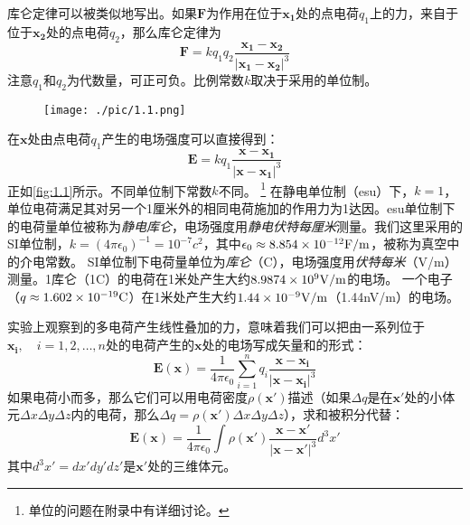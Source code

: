 \documentclass[12pt]{book}
\numberwithin{equation}{chapter}
\numberwithin{figure}{chapter}
\numberwithin{footnote}{page}
\begin{document}
库仑定律可以被类似地写出。如果$\mathbf{F}$为作用在位于$\mathbf{x_1}$处的点电荷$q_1$上的力，来自于位于$\mathbf{x_2}$处的点电荷$q_2$，那么库仑定律为
\begin{equation}\label{eq:1.2}
    \mathbf{F}=kq_1q_2\frac{\mathbf{x_1}-\mathbf{x_2}}{|\mathbf{x_1}-\mathbf{x_2}|^3}
\end{equation}
注意$q_1$和$q_2$为代数量，可正可负。比例常数$k$取决于采用的单位制。

\begin{figure}[!ht]
    \centering
    \texttt{[image: ./pic/1.1.png]}
    \captionsetup{justification=raggedright, singlelinecheck=false}
    \caption{}
    \label{fig:1.1}
\end{figure}

在$\mathbf{x}$处由点电荷$q_1$产生的电场强度可以直接得到：
\begin{equation}\label{eq:1.3}
    \mathbf{E}=kq_1\frac{\mathbf{x}-\mathbf{x_1}}{|\mathbf{x}-\mathbf{x_1}|^3}
\end{equation}
正如\autoref{fig:1.1}所示。不同单位制下常数$k$不同。
\footnote{单位的问题在附录中有详细讨论。}
在静电单位制（esu）下，$k=1$，单位电荷满足其对另一个1厘米外的相同电荷施加的作用力为1达因。esu单位制下的电荷量单位被称为\textit{静电库仑}，电场强度用\textit{静电伏特每厘米}测量。我们这里采用的SI单位制，$k=(4\pi\epsilon_0)^{-1}=10^{-7}c^2$，其中$\epsilon_0\approx8.854\times 10^{-12}{\rm F/m}$，被称为真空中的介电常数。
SI单位制下电荷量单位为\textit{库仑}（C），电场强度用\textit{伏特每米}（V/m）测量。1库仑（1C）的电荷在1米处产生大约$8.9874\times 10^9{\rm V/m}$的电场。
一个电子（$q\approx1.602\times 10^{-19}{\rm C}$）在1米处产生大约$1.44\times 10^{-9}{\rm V/m}$（1.44nV/m）的电场。

实验上观察到的多电荷产生线性叠加的力，意味着我们可以把由一系列位于$\mathbf{x_i},\quad i=1,2,\dots,n$处的电荷产生的$\mathbf{x}$处的电场写成矢量和的形式：
\begin{equation}\label{eq:1.4}
    \mathbf{E}(\mathbf{x})=\frac{1}{4\pi\epsilon_0}\sum_{i=1}^n q_i\frac{\mathbf{x}-\mathbf{x_i}}{|\mathbf{x}-\mathbf{x_i}|^3}
\end{equation}
如果电荷小而多，那么它们可以用电荷密度$\rho(\mathbf{x'})$描述（如果$\Delta q$是在$\mathbf{x'}$处的小体元$\Delta x\Delta y\Delta z$内的电荷，那么$\Delta q=\rho(\mathbf{x'})\Delta x\Delta y\Delta z$），求和被积分代替：
\begin{equation}\label{eq:1.5}
    \mathbf{E}(\mathbf{x})=\frac{1}{4\pi\epsilon_0}\int \rho(\mathbf{x'})\frac{\mathbf{x}-\mathbf{x'}}{|\mathbf{x}-\mathbf{x'}|^3}d^3 x'
\end{equation}
其中$d^3 x'=dx'dy'dz'$是$\mathbf{x'}$处的三维体元。
\end{document}

